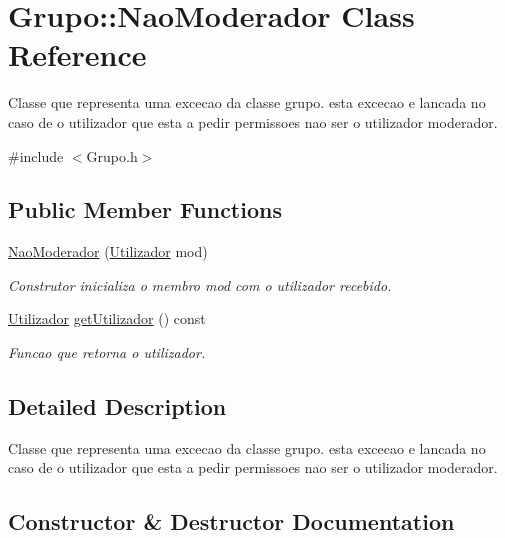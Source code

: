\hypertarget{class_grupo_1_1_nao_moderador}{}\section{Grupo\+:\+:Nao\+Moderador Class Reference}
\label{class_grupo_1_1_nao_moderador}


Classe que representa uma excecao da classe grupo. esta excecao e lancada no caso de o utilizador que esta a pedir permissoes nao ser o utilizador moderador.  




{\ttfamily \#include $<$Grupo.\+h$>$}

\subsection*{Public Member Functions}
\begin{DoxyCompactItemize}
\item 
\hyperlink{class_grupo_1_1_nao_moderador_aa3414e6aa23955428633d53dcae7556d}{Nao\+Moderador} (\hyperlink{class_utilizador}{Utilizador} mod)
\begin{DoxyCompactList}\small\item\em Construtor inicializa o membro mod com o utilizador recebido. \end{DoxyCompactList}\item 
\hyperlink{class_utilizador}{Utilizador} \hyperlink{class_grupo_1_1_nao_moderador_a4454674ecb909b168527dee698bd5580}{get\+Utilizador} () const 
\begin{DoxyCompactList}\small\item\em Funcao que retorna o utilizador. \end{DoxyCompactList}\end{DoxyCompactItemize}


\subsection{Detailed Description}
Classe que representa uma excecao da classe grupo. esta excecao e lancada no caso de o utilizador que esta a pedir permissoes nao ser o utilizador moderador. 

\subsection{Constructor \& Destructor Documentation}
\hypertarget{class_grupo_1_1_nao_moderador_aa3414e6aa23955428633d53dcae7556d}{}

